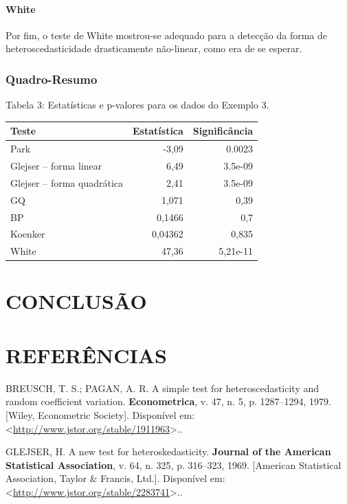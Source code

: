 \documentclass[a4paper, 12pt]{article}
\let\oldparagraph\paragraph
\renewcommand{\paragraph}[1]{\oldparagraph{#1}\mbox{}}
\begin{document}
\hypertarget{white-2}{%
\paragraph{White}\label{white-2}}

Por fim, o teste de White mostrou-se adequado para a detecção da forma
de heteroscedasticidade drasticamente não-linear, como era de se
esperar.

\hypertarget{quadro-resumo-2}{%
\subsubsection{Quadro-Resumo}\label{quadro-resumo-2}}

\centerline{Tabela 3: Estatísticas e p-valores para os dados do Exemplo 3.}

\begin{longtable}[]{@{}lrr@{}}
\toprule
Teste & Estatística & Significância\tabularnewline
\midrule
\endhead
Park & -3,09 & 0.0023\tabularnewline
Glejser -- forma linear & 6,49 & 3.5e-09\tabularnewline
Glejser -- forma quadrática & 2,41 & 3.5e-09\tabularnewline
GQ & 1,071 & 0,39\tabularnewline
BP & 0,1466 & 0,7\tabularnewline
Koenker & 0,04362 & 0,835\tabularnewline
White & 47,36 & 5,21e-11\tabularnewline
\bottomrule
\end{longtable}

\hypertarget{conclusao}{%
\section{CONCLUSÃO}\label{conclusao}}

\hypertarget{referencias}{%
\section*{REFERÊNCIAS}\label{referencias}}

\hypertarget{refs}{}
\leavevmode\hypertarget{ref-BP}{}%
BREUSCH, T. S.; PAGAN, A. R. A simple test for heteroscedasticity and
random coefficient variation. \textbf{Econometrica}, v. 47, n. 5, p.
1287--1294, 1979. {[}Wiley, Econometric Society{]}. Disponível em:
\textless{}\url{http://www.jstor.org/stable/1911963}\textgreater{}..

\leavevmode\hypertarget{ref-glejser}{}%
GLEJSER, H. A new test for heteroskedasticity. \textbf{Journal of the
American Statistical Association}, v. 64, n. 325, p. 316--323, 1969.
{[}American Statistical Association, Taylor \& Francis, Ltd.{]}.
Disponível em:
\textless{}\url{http://www.jstor.org/stable/2283741}\textgreater{}..
\end{document}
